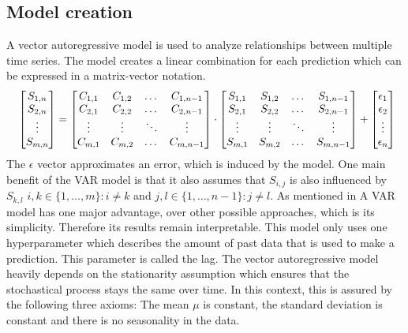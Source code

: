 \documentclass{article}
\theoremstyle{plain}
\theoremstyle{definition}
\theoremstyle{remark}
\begin{document}
\subsection{Model creation}\label{sec:methods:var}
A vector autoregressive model is used to analyze relationships between multiple time series.
The model creates a linear combination for each prediction which can be expressed in a matrix-vector notation.
\begin{equation*}
    \resizebox{\linewidth}{!}{
        $\begin{bmatrix}
            S_{1,n}\\
            S_{2,n}\\
            \vdots \\
            S_{m,n}
        \end{bmatrix} = 
        \begin{bmatrix}
            C_{1,1} & C_{1,2} & \dots &C_{1,n-1}\\
            C_{2,1} & C_{2,2} &\dots & C_{2,n-1}\\
            \vdots & \vdots  & \ddots &\vdots\\
            C_{m,1} & C_{m,2} &\dots &C_{m,n-1}\\
        \end{bmatrix} \cdot
        \begin{bmatrix}
            S_{1,1} & S_{1,2} & \dots & S_{1,n-1}\\
            S_{2,1} & S_{2,2} & \dots & S_{2,n-1}\\
            \vdots & \vdots  & \ddots &\vdots\\
            S_{m,1} & S_{m,2} & \dots & S_{m,n-1}\\
        \end{bmatrix}+
        \begin{bmatrix}
            \epsilon_{1}\\
            \epsilon_{2}\\
            \vdots\\
            \epsilon_{n}\\
        \end{bmatrix}$%
    }
\end{equation*}
The $\epsilon$ vector approximates an error, which is induced by the model. One main benefit of the VAR model is that it also assumes
that $S_{i,j}$ is also influenced by $S_{k,l}$ $i,k \in \{1,\dots, m\}: i\neq k$ and $j,l \in \{1,\dots, n-1\}: j\neq l$. As mentioned in \citep{var}
A VAR model has one major advantage, over other possible approaches, which is its simplicity. Therefore its results remain interpretable.
This model only uses one hyperparameter which describes the amount of past data that is used to make a prediction. This parameter is called the lag.
The vector autoregressive model heavily depends on the stationarity assumption which ensures that the stochastical process stays the same over time. 
In this context, this is assured by the following three axioms: The mean $\mu$ is constant, the standard deviation is constant
and there is no seasonality in the data.
\end{document}
